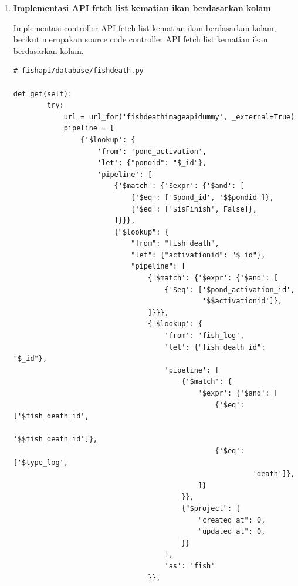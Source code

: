 \begin{enumerate}[1.]



\item \textbf{Implementasi API fetch list kematian ikan berdasarkan kolam}

Implementasi controller API fetch list kematian ikan berdasarkan kolam, berikut merupakan source code controller API fetch list kematian ikan berdasarkan kolam.

\begin{lstlisting}
# fishapi/database/fishdeath.py

def get(self):
        try:
            url = url_for('fishdeathimageapidummy', _external=True)
            pipeline = [
                {'$lookup': {
                    'from': 'pond_activation',
                    'let': {"pondid": "$_id"},
                    'pipeline': [
                        {'$match': {'$expr': {'$and': [
                            {'$eq': ['$pond_id', '$$pondid']},
                            {'$eq': ['$isFinish', False]},
                        ]}}},
                        {"$lookup": {
                            "from": "fish_death",
                            "let": {"activationid": "$_id"},
                            "pipeline": [
                                {'$match': {'$expr': {'$and': [
                                    {'$eq': ['$pond_activation_id',
                                             '$$activationid']},
                                ]}}},
                                {'$lookup': {
                                    'from': 'fish_log',
                                    'let': {"fish_death_id": "$_id"},
                                    'pipeline': [
                                        {'$match': {
                                            '$expr': {'$and': [
                                                {'$eq': ['$fish_death_id',
                                                         '$$fish_death_id']},
                                                {'$eq': ['$type_log',
                                                         'death']},
                                            ]}
                                        }},
                                        {"$project": {
                                            "created_at": 0,
                                            "updated_at": 0,
                                        }}
                                    ],
                                    'as': 'fish'
                                }},

\end{lstlisting}
\end{enumerate}
